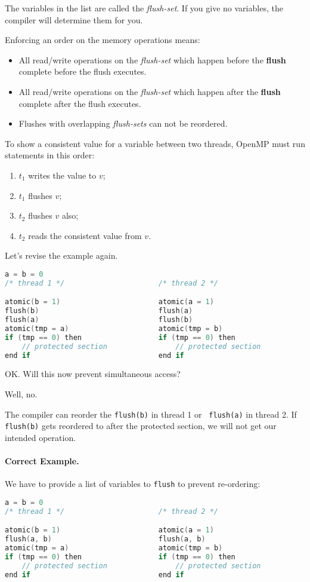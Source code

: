 The variables in the list are called the {\it flush-set}. 
If you give no variables, the compiler will determine them for you.

Enforcing an order on the memory operations means:
\begin{itemize}
    \item All read/write operations on the {\it flush-set} which happen
      before the {\bf flush} complete before the flush executes.
    \item All read/write operations on the {\it flush-set} which happen
      after the {\bf flush} complete after the flush executes.
    \item Flushes with overlapping {\it flush-sets} can not be reordered.
\end{itemize}

To show a consistent value for a variable between two threads, OpenMP
must run statements in this order:

  \begin{enumerate}
    \item $t_1$ writes the value to $v$;
    \item $t_1$ flushes $v$; 
    \item $t_2$ flushes $v$ also;
    \item $t_2$ reads the consistent value from $v$.
  \end{enumerate}

Let's revise the example again.
  \begin{lstlisting}[language=C]
                    a = b = 0
/* thread 1 */                      /* thread 2 */

atomic(b = 1)                       atomic(a = 1)
flush(b)                            flush(a)
flush(a)                            flush(b)
atomic(tmp = a)                     atomic(tmp = b)
if (tmp == 0) then                  if (tmp == 0) then
    // protected section                // protected section
end if                              end if
  \end{lstlisting}

OK. Will this now prevent simultaneous access?

Well, no.

The compiler can reorder the {\tt flush(b)} in thread 1 or {\tt
  flush(a)} in thread 2. If {\tt flush(b)} gets reordered to after the
protected section, we will not get our intended operation.

\paragraph{Correct Example.} We have to provide a list of variables
to {\tt flush} to prevent re-ordering:
  \begin{lstlisting}[language=C]
                    a = b = 0
/* thread 1 */                      /* thread 2 */

atomic(b = 1)                       atomic(a = 1)
flush(a, b)                         flush(a, b)
atomic(tmp = a)                     atomic(tmp = b)
if (tmp == 0) then                  if (tmp == 0) then
    // protected section                // protected section
end if                              end if
  \end{lstlisting}

